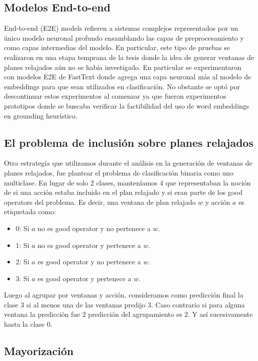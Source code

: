 \subsection{Modelos End-to-end}

End-to-end (E2E) models refieren a sistemas complejos representados por un único modelo neuronal profundo ensamblando las capas de preprocesamiento y como capas intermedias del modelo. En particular, este tipo de pruebas se realizaron en una etapa temprana de la tesis donde la idea de generar ventanas de planes relajados aún no se había investigado. En particular se experimentaron con modelos E2E de FastText donde agrega una capa neuronal más al modelo de embeddings para que sean utilizados en clasificación.
No obstante se optó por descontinuar estos experimentos al comenzar ya que fueron experimentos prototipos donde se buscaba verificar la factibilidad del uso de word embeddings en grounding heurístico.

\subsection{El problema de inclusión sobre planes relajados}

Otra estrategía que utilizamos durante el análisis en la generación de ventanas de planes relajados, fue plantear el problema de clasificación binaria como uno multiclase. En lugar de solo 2 clases, manteníamos 4 que representaban la noción de si una acción estaba incluido en el plan relajado y si eran parte de los good operators del problema. Es decir, una ventana de plan relajado $w$ y acción $a$ es etiquetada como:

\begin{itemize}
    \item 0: Si $a$ no es good operator y no pertenece a $w$.
    \item 1: Si $a$ no es good operator y pertenece a $w$.
    \item 2: Si $a$ es good operator y no pertenece a $w$.
    \item 3: Si $a$ es good operator y pertenece a $w$.
\end{itemize}

Luego al agrupar por ventanas y acción, consideramos como predicción final la clase $3$ si al menos una de las ventanas predijo $3$. Caso contrario si para alguna ventana la predicción fue $2$ predicción del agrupamiento es $2$. Y así sucesivamente hasta la clase $0$.

\subsection{Mayorización}

